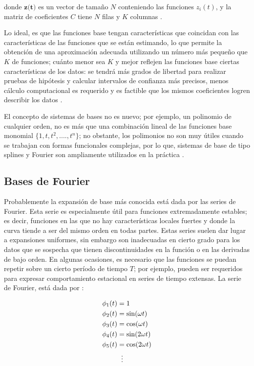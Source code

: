 \documentclass[
]{book}
\begin{document}
donde \(\textbf{z(t)}\) es un vector de tamaño \(N\) conteniendo las funciones \(z_i(t)\), y la matriz de coeficientes \(C\) tiene \(N\) filas y \(K\) columnas \citep{programsay}.

Lo ideal, es que las funciones base tengan características que coincidan con las características de las funciones que se están estimando, lo que permite la obtención de una aproximación adecuada utilizando un número más pequeño que \(K\) de funciones; cuánto menor sea \(K\) y mejor reflejen las funciones base ciertas características de los datos: se tendrá más grados de libertad para realizar pruebas de hipótesis y calcular intervalos de confianza más precisos, menos cálculo computacional es requerido y es factible que los mismos coeficientes logren describir los datos \citep{ramsay}.

El concepto de sistemas de bases no es nuevo; por ejemplo, un polinomio de cualquier orden, no es más que una combinación lineal de las funciones base monomial \(\{1,t,t^2,....,t^n\}\); no obstante, los polimonios no son muy útiles cuando se trabajan con formas funcionales complejas, por lo que, sistemas de base de tipo splines y Fourier son ampliamente utilizados en la práctica \citep{programsay}.

\hypertarget{bases-de-fourier}{%
\subsection*{Bases de Fourier}\label{bases-de-fourier}}

Probablemente la expansión de base más conocida está dada por las series de Fourier. Esta serie es especialmente útil para funciones extremadamente estables; es decir, funciones en las que no hay características locales fuertes y donde la curva tiende a ser del mismo orden en todas partes. Estas series suelen dar lugar a expansiones uniformes, sin embargo son inadecuadas en cierto grado para los datos que se sospecha que tienen discontinuidades en la función o en las derivadas de bajo orden\citep{ramsay}. En algunas ocasiones, es necesario que las funciones se puedan repetir sobre un cierto período de tiempo \(T\); por ejemplo, pueden ser requeridos para expresar comportamiento estacional en series de tiempo extensas. La serie de Fourier, está dada por \citep{programsay}:

\begin{align*}
    \phi_1(t)&=1\\
    \phi_2(t)&=\sin(\omega t)\\
    \phi_3(t)&=\cos(\omega t)\\
    \phi_4(t)&=\sin(2\omega t)\\
    \phi_5(t)&=\cos(2\omega t)\\
    & \hspace{0.2cm}\vdots
\end{align*}
\end{document}
